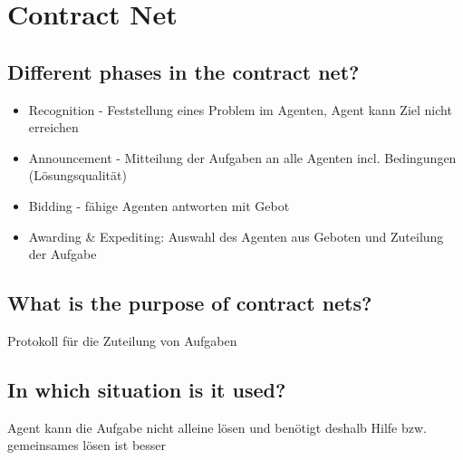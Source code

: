 \section{Contract Net}
\subsection{Different phases in the contract net?}
\begin{itemize}
	\item Recognition - Feststellung eines Problem im Agenten, Agent kann Ziel nicht erreichen
	\item Announcement - Mitteilung der Aufgaben an alle Agenten incl. Bedingungen (Lösungsqualität)
	\item Bidding - fähige Agenten antworten mit Gebot
	\item Awarding \& Expediting: Auswahl des Agenten aus Geboten und Zuteilung der Aufgabe
\end{itemize}
\subsection{What is the purpose of contract nets?}
Protokoll für die Zuteilung von Aufgaben
\subsection{In which situation is it used?}
Agent kann die Aufgabe nicht alleine lösen und benötigt deshalb Hilfe bzw. gemeinsames lösen ist besser